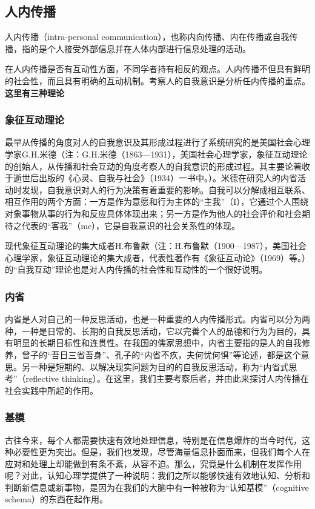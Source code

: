\documentclass[UTF8,12pt]{ctexart}
\numberwithin{equation}{section} %
\numberwithin{figure}{section}
\numberwithin{table}{section}
\begin{document}
	
	
	
	
	\subsection{人内传播}
	人内传播（intra-personal communication），也称内向传播、内在传播或自我传播，指的是个人接受外部信息并在人体内部进行信息处理的活动。
	
	在人内传播是否有互动性方面，不同学者持有相反的观点。人内传播不但具有鲜明的社会性，而且具有明确的互动机制。考察人的自我意识是分析任内传播的重点。\textbf{这里有三种理论}
	
	\subsubsection{象征互动理论}
	最早从传播的角度对人的自我意识及其形成过程进行了系统研究的是美国社会心理学家G.H.米德（注：G.H.米德（1863—1931），美国社会心理学家，象征互动理论的创始人，从传播和社会互动的角度考察人的自我意识的形成过程。其主要论著收于逝世后出版的《心灵、自我与社会》（1934）一书中。）。米德在研究人的内省活动时发现，自我意识对人的行为决策有着重要的影响。自我可以分解成相互联系、相互作用的两个方面：一方是作为意愿和行为主体的“主我”（I），它通过个人围绕对象事物从事的行为和反应具体体现出来；另一方是作为他人的社会评价和社会期待之代表的“客我”（me），它是自我意识的社会关系性的体现。
	
	现代象征互动理论的集大成者H.布鲁默（注：H.布鲁默（1900—1987），美国社会心理学家，象征互动理论的集大成者，代表性著作有《象征互动论》（1969）等。）的“自我互动”理论也是对人内传播的社会性和互动性的一个很好说明。
	
	\subsubsection{内省}
	内省是人对自己的一种反思活动，也是一种重要的人内传播形式。内省可以分为两种，一种是日常的、长期的自我反思活动，它以完善个人的品德和行为为目的，具有明显的长期目标性和连贯性。在我国的儒家思想中，内省主要指的是人的自我修养，曾子的“吾日三省吾身”、孔子的“内省不疚，夫何忧何惧”等论述，都是这个意思。另一种是短期的、以解决现实问题为目的的自我反思活动，称为“内省式思考”（reflective thinking）。在这里，我们主要考察后者，并由此来探讨人内传播在社会实践中所起的作用。
	
	\subsubsection{基模}
	古往今来，每个人都需要快速有效地处理信息，特别是在信息爆炸的当今时代，这种必要性更为突出。但是，我们也发现，尽管海量信息扑面而来，但我们每个人在应对和处理上却能做到有条不紊，从容不迫。那么，究竟是什么机制在发挥作用呢？对此，认知心理学提供了一种说明：我们之所以能够快速有效地认知、分析和判断新信息或新事物，是因为在我们的大脑中有一种被称为“认知基模”（cognitive schema）的东西在起作用。
	
\end{document}
